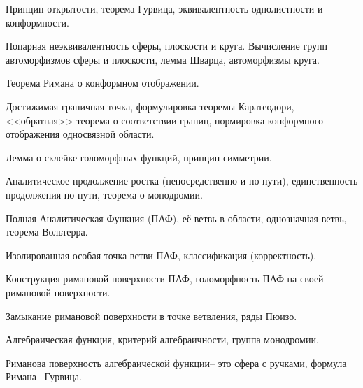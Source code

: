 \documentclass[a4paper]{article}
\begin{document}
\begin{nums}{-2}
\item Принцип открытости, теорема Гурвица, эквивалентность  однолистности и конформности.
\item Попарная неэквивалентность сферы, плоскости и круга. Вычисление групп автоморфизмов
      сферы и плоскости, лемма Шварца, автоморфизмы круга.
\item Теорема Римана о конформном отображении.
\item Достижимая граничная точка, формулировка теоремы Каратеодори, <<обратная>> теорема о
соответствии границ, нормировка конформного отображения односвязной области.
\item Лемма о склейке голоморфных функций, принцип симметрии.
\item Аналитическое продолжение ростка (непосредственно и по пути), единственность продолжения по пути,
теорема о монодромии.
\item Полная Аналитическая Функция (ПАФ), её ветвь в области, однозначная ветвь, теорема Вольтерра.
\item Изолированная особая точка ветви ПАФ, классификация (корректность).
\item Конструкция римановой поверхности ПАФ, голоморфность ПАФ на своей римановой  поверхности.
\item Замыкание римановой поверхности в точке ветвления, ряды Пюизо.
\item Алгебраическая функция, критерий алгебраичности, группа монодромии.
\item Риманова поверхность алгебраической функции-- это сфера с ручками, формула Римана-- Гурвица.
\end{nums}

\pagebreak
\end{document}
